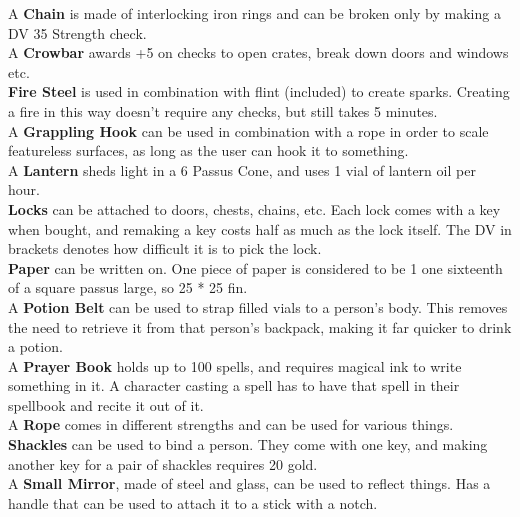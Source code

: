 A \textbf{Chain} is made of interlocking iron rings and can be broken only by making a DV 35 Strength check.\\

A \textbf{Crowbar} awards +5 on checks to open crates, break down doors and windows etc.\\

\textbf{Fire Steel} is used in combination with flint (included) to create sparks. Creating a fire in this way doesn't require any checks, but still takes 5 minutes.\\

A \textbf{Grappling Hook} can be used in combination with a rope in order to scale featureless surfaces, as long as the user can hook it to something.\\

A \textbf{Lantern} sheds light in a 6 Passus Cone, and uses 1 vial of lantern oil per hour.\\

\textbf{Locks} can be attached to doors, chests, chains, etc. Each lock comes with a key when bought, and remaking a key costs half as much as the lock itself. The DV in brackets denotes how difficult it is to pick the lock.\\

\textbf{Paper} can be written on. One piece of paper is considered to be 1 one sixteenth of a square passus large, so 25 * 25 fin.\\

A \textbf{Potion Belt} can be used to strap filled vials to a person's body. This removes the need to retrieve it from that person's backpack, making it far quicker to drink a potion.\\
	
A \textbf{Prayer Book} holds up to 100 spells, and requires magical ink to write something in it. A character casting a spell has to have that spell in their spellbook and recite it out of it.\\

A \textbf{Rope} comes in different strengths and can be used for various things.\\

\textbf{Shackles} can be used to bind a person. They come with one key, and making another key for a pair of shackles requires 20 gold.\\

A \textbf{Small Mirror}, made of steel and glass, can be used to reflect things. Has a handle that can be used to attach it to a stick with a notch.\\

